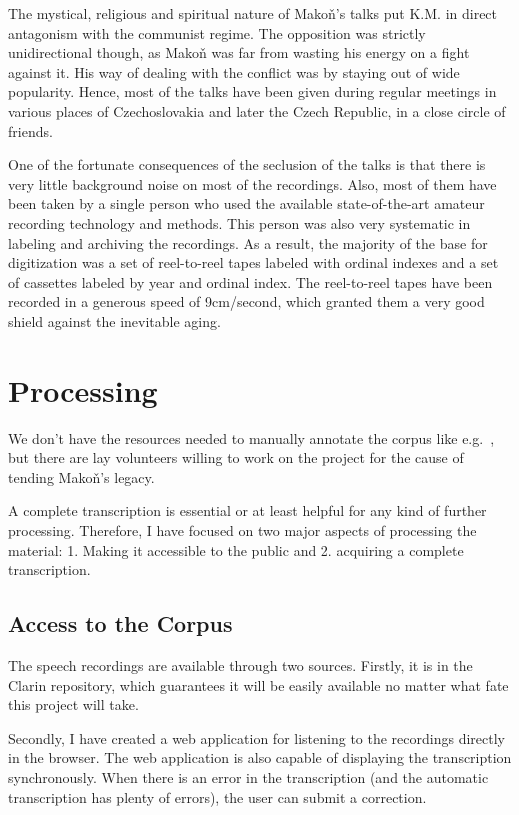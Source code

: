 \documentclass[a4paper,11pt]{article}
\begin{document}
The mystical, religious and spiritual nature of Mako\v{n}'s talks put K.M. in
direct antagonism with the communist regime. The opposition was strictly
unidirectional though, as Mako\v{n}
was far from wasting his energy on a fight against it. His way of dealing
with the conflict was by staying out of wide popularity. Hence, most of the
talks have been given during regular meetings in various places of
Czechoslovakia and later the Czech Republic, in a close circle of friends.

One of the fortunate consequences of the seclusion of the talks is that there is
very little background noise on most of the recordings. Also, most of them
have been taken by a single person who used the available state-of-the-art
amateur recording technology and methods. This person was also very systematic
in labeling and archiving the recordings. As a result, the majority of the base
for digitization was a set of reel-to-reel tapes labeled with ordinal indexes
and a set of cassettes labeled by year and ordinal index. The reel-to-reel tapes
have been recorded in a generous speed of 9cm/second, which granted them a very
good shield against the inevitable aging.

\section{Processing}

We don't have the resources needed to manually annotate the corpus like
e.g.~\cite{maekawa2000spontaneous}, but there are lay
volunteers willing to work on the project for the cause of tending Mako\v{n}'s
legacy.

A complete transcription is essential or at least helpful for any kind of
further processing.  Therefore,
I have focused on two major aspects of processing the material: 1. Making it
accessible to the public and 2. acquiring a complete transcription.

\subsection{Access to the Corpus}

The speech recordings are available through two sources. Firstly,
it is in the Clarin repository, which guarantees it will be easily available no
matter what fate this project will take.

Secondly, I have created a web application for listening to the recordings
directly in the browser. The web application is also capable of displaying the
transcription synchronously. When there is an error in the transcription (and
the automatic transcription has plenty of errors), the user can submit a
correction.
\end{document}
